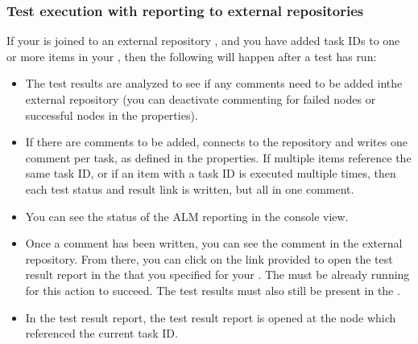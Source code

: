 
\subsubsection{Test execution with reporting to external repositories}
If your \gdproject{} is joined to an external repository , and you have added task IDs to one or more items in your \gdproject{} , then the following will happen after a test has run:

\begin{itemize}
\item The test results are analyzed to see if any comments need to be added inthe external repository (you can deactivate commenting for failed nodes or successful nodes in the \gdproject{} properties). 
\item If there are comments to be added, \ite{} connects to the repository and writes one comment per task, as defined in the \gdproject{} properties. If multiple items reference the same task ID, or if an item with a task ID is executed multiple times,  then each test status and result link is written, but all in one comment. 
\item You can see the status of the ALM reporting in the console view. 
\item Once a comment has been written, you can see the comment in the external repository. From there, you can click on the link provided to open the test result report in the \dash{} that you specified for your \gdproject{}. The \dash{} must be already running for this action to succeed. The test results must also still be present in the \gddb{} .
\item In the test result report, the test result report is opened at the node which referenced the current task ID. 
\end{itemize}


